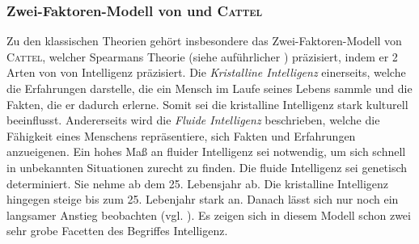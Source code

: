 \documentclass[a4paper, 11pt]{scrartcl}
\begin{document}
\subsubsection{Zwei-Faktoren-Modell von und \textsc{Cattel}}
Zu den klassischen Theorien gehört insbesondere das Zwei-Faktoren-Modell von \textsc{Cattel}, welcher Spearmans Theorie (siehe auführlicher \cite{Spektrum2000}) präzisiert, indem er 2 Arten von von Intelligenz präzisiert. Die \textit{Kristalline Intelligenz} einerseits, welche die Erfahrungen darstelle, die ein Mensch im Laufe seines Lebens sammle und die Fakten, die er dadurch erlerne. Somit sei die kristalline Intelligenz stark kulturell beeinflusst. Andererseits wird die \textit{Fluide Intelligenz} beschrieben, welche die Fähigkeit eines Menschens repräsentiere, sich Fakten und Erfahrungen anzueigenen. Ein hohes Maß an fluider Intelligenz sei notwendig, um sich schnell in unbekannten Situationen zurecht zu finden. Die fluide Intelligenz sei genetisch determiniert.  Sie nehme ab dem 25. Lebensjahr ab. Die kristalline Intelligenz hingegen steige bis zum 25. Lebenjahr stark an. Danach lässt sich nur noch ein langsamer Anstieg beobachten (vgl. \cite{Dorsch2019}). Es zeigen sich in diesem Modell schon zwei sehr grobe Facetten des Begriffes Intelligenz.
\end{document}
